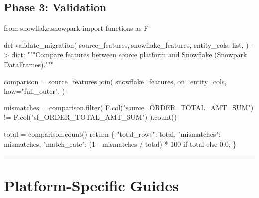 \documentclass[
  letterpaper,
  DIV=11,
  numbers=noendperiod]{scrreprt}
\newenvironment{Shaded}{\begin{snugshade}}{\end{snugshade}}
\newcommand{\BuiltInTok}[1]{\textcolor[rgb]{0.00,0.23,0.31}{#1}}
\newcommand{\CommentTok}[1]{\textcolor[rgb]{0.37,0.37,0.37}{#1}}
\newcommand{\ControlFlowTok}[1]{\textcolor[rgb]{0.00,0.23,0.31}{#1}}
\newcommand{\DecValTok}[1]{\textcolor[rgb]{0.68,0.00,0.00}{#1}}
\newcommand{\FloatTok}[1]{\textcolor[rgb]{0.68,0.00,0.00}{#1}}
\newcommand{\ImportTok}[1]{\textcolor[rgb]{0.00,0.46,0.62}{#1}}
\newcommand{\KeywordTok}[1]{\textcolor[rgb]{0.00,0.23,0.31}{#1}}
\newcommand{\NormalTok}[1]{\textcolor[rgb]{0.00,0.23,0.31}{#1}}
\newcommand{\OperatorTok}[1]{\textcolor[rgb]{0.37,0.37,0.37}{#1}}
\newcommand{\StringTok}[1]{\textcolor[rgb]{0.13,0.47,0.30}{#1}}
\begin{document}
\hypertarget{phase-3-validation}{%
\subsection{Phase 3: Validation}\label{phase-3-validation}}

\begin{Shaded}
\begin{Highlighting}[]
\ImportTok{from}\NormalTok{ snowflake.snowpark }\ImportTok{import}\NormalTok{ functions }\ImportTok{as}\NormalTok{ F}

\KeywordTok{def}\NormalTok{ validate\_migration(}
\NormalTok{    source\_features,}
\NormalTok{    snowflake\_features,}
\NormalTok{    entity\_cols: }\BuiltInTok{list}\NormalTok{,}
\NormalTok{) }\OperatorTok{{-}\textgreater{}} \BuiltInTok{dict}\NormalTok{:}
    \CommentTok{"""Compare features between source platform and Snowflake (Snowpark DataFrames)."""}

\NormalTok{    comparison }\OperatorTok{=}\NormalTok{ source\_features.join(}
\NormalTok{        snowflake\_features,}
\NormalTok{        on}\OperatorTok{=}\NormalTok{entity\_cols,}
\NormalTok{        how}\OperatorTok{=}\StringTok{"full\_outer"}\NormalTok{,}
\NormalTok{    )}

\NormalTok{    mismatches }\OperatorTok{=}\NormalTok{ comparison.}\BuiltInTok{filter}\NormalTok{(}
\NormalTok{        F.col(}\StringTok{"source\_ORDER\_TOTAL\_AMT\_SUM"}\NormalTok{) }\OperatorTok{!=}\NormalTok{ F.col(}\StringTok{"sf\_ORDER\_TOTAL\_AMT\_SUM"}\NormalTok{)}
\NormalTok{    ).count()}

\NormalTok{    total }\OperatorTok{=}\NormalTok{ comparison.count()}
    \ControlFlowTok{return}\NormalTok{ \{}
        \StringTok{"total\_rows"}\NormalTok{: total,}
        \StringTok{"mismatches"}\NormalTok{: mismatches,}
        \StringTok{"match\_rate"}\NormalTok{: (}\DecValTok{1} \OperatorTok{{-}}\NormalTok{ mismatches }\OperatorTok{/}\NormalTok{ total) }\OperatorTok{*} \DecValTok{100} \ControlFlowTok{if}\NormalTok{ total }\ControlFlowTok{else} \FloatTok{0.0}\NormalTok{,}
\NormalTok{    \}}
\end{Highlighting}
\end{Shaded}

\begin{center}\rule{0.5\linewidth}{0.5pt}\end{center}

\hypertarget{platform-specific-guides}{%
\section{Platform-Specific Guides}\label{platform-specific-guides}}
\end{document}

